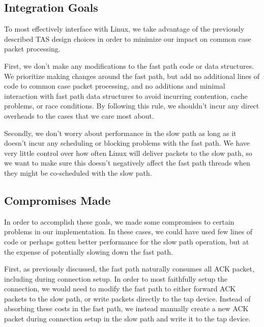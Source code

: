 \subsection{Integration Goals}

To most effectively interface with Linux, we take advantage of the previously 
described TAS design choices in order to minimize our impact on common case
packet processing. 

First, we don't make any modifications to the fast path code or data structures.
We prioritize making changes around the fast path, but add no additional lines 
of code to common case packet processing, and no additions and minimal 
interaction with fast path data structures to avoid incurring contention, cache 
problems, or race conditions. By following this rule, we shouldn't incur any
direct overheads to the cases that we care most about.

Secondly, we don't worry about performance in the slow path as long as it
doesn't incur any scheduling or blocking problems with the fast path. We have 
very little control over how often Linux will deliver packets to the slow path, 
so we want to make sure this doesn't negatively affect the fast path threads 
when they might be co-scheduled with the slow path.

\subsection{Compromises Made}

In order to accomplish these goals, we made some compromises to certain problems
in our implementation. In these cases, we could have used few lines of code or 
perhaps gotten better performance for the slow path operation, but at the 
expense of potentially slowing down the fast path.

First, as previously discussed, the fast path naturally consumes all ACK packet,
including during connection setup. In order to most faithfully setup the 
connection, we would need to modify the fast path to either forward ACK packets 
to the slow path, or write packets directly to the tap device. Instead of 
absorbing these costs in the fast path, we instead manually create a new ACK
packet during connection setup in the slow path and write it to the tap device.

